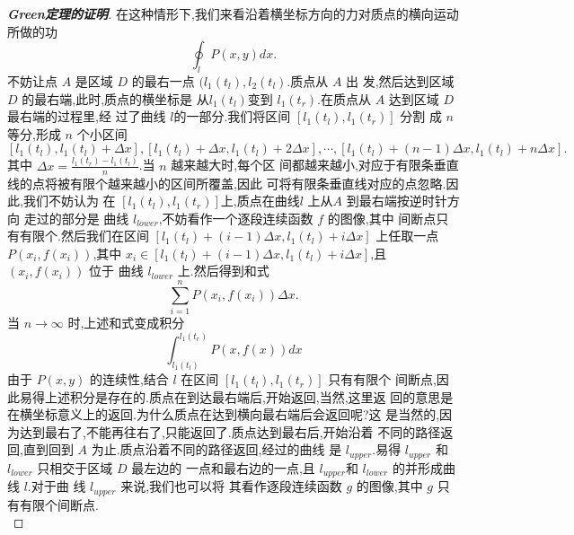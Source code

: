 \documentclass[twoside,11pt]{article}
\begin{document}
\begin{proof}[\bf{Green定理的证明}]
在这种情形下,我们来看沿着横坐标方向的力对质点的横向运动所做的功
$$
\oint_lP(x,y)dx.
$$
不妨让点 $A$ 是区域 $D$ 的最右一点 $(l_1(t_l),l_2(t_l)$.质点从 $A$ 出
发,然后达到区域 $D$ 的最右端,此时,质点的横坐标是
从$l_1(t_l)$变到 $l_1(t_r)$.在质点从 $A$ 达到区域 $D$最右端的过程里,经
过了曲线 $l$的一部分.我们将区间 $[l_1(t_l),l_1(t_r)]$ 分割
成 $n$ 等分,形成 $n$ 个小区间
\begin{equation}\label{eq:1} [l_1(t_l),l_1(t_l)+\Delta
  x],[l_1(t_l)+\Delta x,l_1(t_l)+2\Delta
  x],\cdots,[l_1(t_l)+(n-1)\Delta x,l_1(t_l)+n\Delta x].
\end{equation}
其中 $\Delta x=\frac{l_1(t_r)-l_1(t_{l})}{n}$.当 $n$ 越来越大时,每个区
间都越来越小,对应于有限条垂直线的点将被有限个越来越小的区间所覆盖,因此
可将有限条垂直线对应的点忽略.因此,我们不妨认为
在 $[l_1(t_l),l_1(t_r)]$上,质点在曲线$ l$ 上从$A$ 到最右端按逆时针方向
走过的部分是 曲线 $l_{lower}$,不妨看作一个逐段连续函数 $f$ 的图像,其中
间断点只有有限个.然后我们在区间 $[l_1(t_l)+(i-1)\Delta x,l_1(t_l)+i
\Delta x]$ 上任取一点 $P(x_{i},f(x_{i}))$,其中 $x_i\in
[l_1(t_l)+(i-1)\Delta x,l_1(t_l)+i\Delta x]$,且 $(x_{i},f(x_{i}))$ 位于
曲线 $l_{lower}$ 上.然后得到和式
$$
\sum_{i=1}^nP(x_{i},f(x_{i}))\Delta x.
$$
当 $n\to \infty$ 时,上述和式变成积分
$$
\int_{l_1(t_l)}^{l_1(t_r)}P(x,f(x))dx
$$
由于 $P(x,y)$ 的连续性,结合 $l$ 在区间 $[l_1(t_l),l_1(t_r)]$ 只有有限个
间断点,因此易得上述积分是存在的.质点在到达最右端后,开始返回,当然,这里返
回的意思是在横坐标意义上的返回.为什么质点在达到横向最右端后会返回呢?这
是当然的,因为达到最右了,不能再往右了,只能返回了.质点达到最右后,开始沿着
不同的路径返回,直到回到 $A$ 为止.质点沿着不同的路径返回,经过的曲线
是 $l_{upper}$.易得 $l_{upper}$ 和$l_{lower}$ 只相交于区域 $D$ 最左边的
一点和最右边的一点,且 $l_{upper}$和 $l_{lower}$ 的并形成曲线 $l$.对于曲
线 $l_{upper}$ 来说,我们也可以将
其看作逐段连续函数 $g$ 的图像,其中 $g$ 只有有限个间断点.\\


\end{proof}
\end{document}
